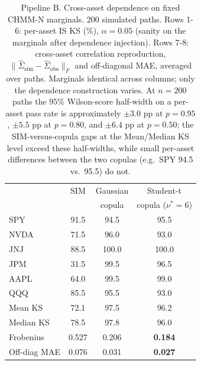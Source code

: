 \documentclass[sigconf,anonymous,nonacm=true]{acmart}
\begin{document}
\begin{table}[t]
\centering
\small
\caption{Pipeline B. Cross-asset dependence on fixed CHMM-N marginals.
200 simulated paths. Rows 1-6: per-asset IS KS (\%), $\alpha = 0.05$
(sanity on the marginals after dependence injection). Rows 7-8:
cross-asset correlation reproduction, $\|\hat\Sigma_{\text{sim}} -
\hat\Sigma_{\text{obs}}\|_F$ and off-diagonal MAE, averaged over paths.
Marginals identical across columns; only the dependence construction
varies. At $n = 200$ paths the $95\%$ Wilson-score half-width on a
per-asset pass rate is approximately $\pm 3.0$ pp at $p = 0.95$, $\pm 5.5$
pp at $p = 0.80$, and $\pm 6.4$ pp at $p = 0.50$; the SIM-versus-copula
gaps at the Mean/Median KS level exceed these half-widths, while small
per-asset differences between the two copulas (e.g.\ SPY 94.5 vs.\ 95.5)
do not.}
\label{tab:dependence}
\begin{tabular}{l c c c}
\toprule
 & SIM & Gaussian & Student-t \\
 &     & copula   & copula ($\nu^* = 6$) \\
\midrule
SPY          & 91.5 & 94.5 & 95.5 \\
NVDA         & 71.5 & 96.0 & 93.0 \\
JNJ          & 88.5 & 100.0 & 100.0 \\
JPM          & 31.5 & 99.5 & 96.5 \\
AAPL         & 64.0 & 99.5 & 99.0 \\
QQQ          & 85.5 & 95.5 & 93.0 \\
\midrule
Mean KS      & 72.1 & 97.5 & 96.2 \\
Median KS    & 78.5 & 97.8 & 96.0 \\
\midrule
Frobenius    & 0.527 & 0.206 & \textbf{0.184} \\
Off-diag MAE & 0.076 & 0.031 & \textbf{0.027} \\
\bottomrule
\end{tabular}
\end{table}
\end{document}
